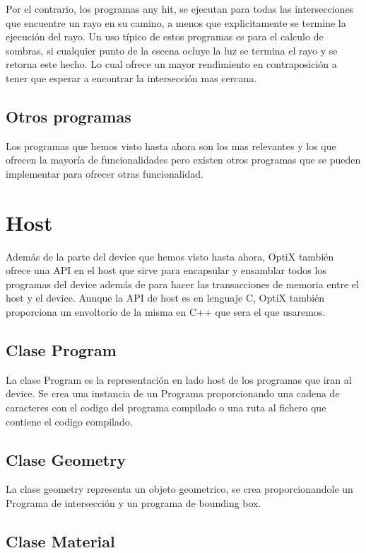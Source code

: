 Por el contrario, los programas any hit, se ejecutan para todas las intersecciones que encuentre un rayo en su camino, a menos que explicitamente se termine la ejecución del rayo.
Un uso típico de estos programas es para el calculo de sombras, si cualquier punto de la escena ocluye la luz se termina el rayo y se retorna este hecho. Lo cual ofrece un mayor rendimiento en contraposición a tener que esperar a encontrar la intersección mas cercana.

\subsection{Otros programas}

Los programas que hemos visto hasta ahora son los mas relevantes y los que ofrecen la mayoría de funcionalidades pero existen otros programas que se pueden implementar para ofrecer otras funcionalidad.

\clearpage

\section{Host}

Además de la parte del device que hemos visto hasta ahora, OptiX también ofrece una API en el host que sirve para encapsular y ensamblar todos los programas del device además de para hacer las transacciones de memoria entre el host y el device. Aunque la API de host es en lenguaje C, OptiX también proporciona un envoltorio de la misma en C++ que sera el que usaremos. 

\subsection{Clase Program}

La clase Program es la representación en lado host de los programas que iran al device.
Se crea una instancia de un Programa proporcionando una cadena de caracteres con el codigo del programa compilado o una ruta al fichero que contiene el codigo compilado. 

\subsection{Clase Geometry}

La clase geometry representa un objeto geometrico, se crea proporcionandole un Programa de intersección y un programa de bounding box.

\subsection{Clase Material}

